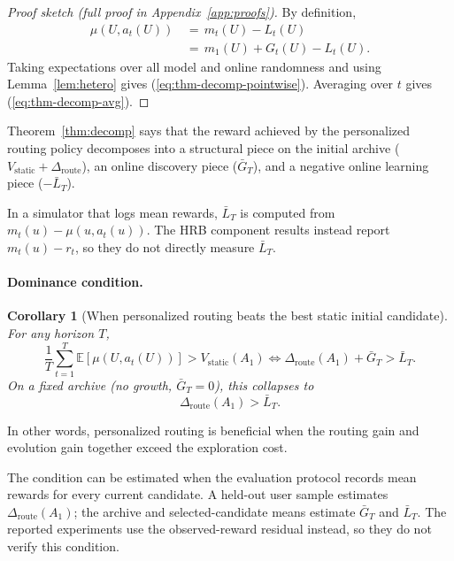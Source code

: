 \documentclass{article} %
\newtheorem{corollary}[theorem]{Corollary}
\providecommand{\E}{\mathbb{E}}
\renewcommand{\eqref}[1]{\textup{(\ref{#1})}}
\begin{document}
\begin{proof}[Proof sketch (full proof in Appendix~\ref{app:proofs})]
By definition,
\begin{equation*}
\begin{aligned}
\mu(U,a_t(U))
&\,=\,m_t(U)-L_t(U)\\
&\,=\,m_1(U)+G_t(U)-L_t(U).
\end{aligned}
\end{equation*}
Taking expectations over all model and online randomness and using
Lemma~\ref{lem:hetero} gives \eqref{eq:thm-decomp-pointwise}. Averaging over
$t$ gives \eqref{eq:thm-decomp-avg}.
\end{proof}

Theorem~\ref{thm:decomp} says that the reward achieved by the personalized routing policy decomposes into a structural piece on the initial archive ($V_{\mathrm{static}}+\Delta_{\mathrm{route}}$), an online discovery piece ($\bar G_T$), and a negative online learning piece ($-\bar L_T$).

In a simulator that logs mean rewards, \(\bar L_T\) is computed from
\(m_t(u)-\mu(u,a_t(u))\). The HRB component results instead report
\(m_t(u)-r_t\), so they do not directly measure \(\bar L_T\).

\paragraph{Dominance condition.}

\label{sec:method-cor-dom}

\begin{corollary}[When personalized routing beats the best static initial candidate]
\label{cor:dominance}
For any horizon $T$,
\begin{equation}
\label{eq:cor-dom}
\frac{1}{T}\sum_{t=1}^T \E[\mu(U, a_t(U))] > V_{\mathrm{static}}(A_1)
\iff
\Delta_{\mathrm{route}}(A_1) + \bar G_T > \bar L_T.
\end{equation}
On a fixed archive (no growth, $\bar G_T = 0$), this collapses to
\begin{equation}
\label{eq:cor-dom-fixed}
\Delta_{\mathrm{route}}(A_1) > \bar L_T.
\end{equation}
\end{corollary}

In other words, personalized routing is beneficial when the routing gain and evolution gain together exceed the exploration cost.

The condition can be estimated when the evaluation protocol records mean
rewards for every current candidate. A held-out user sample estimates
\(\Delta_{\mathrm{route}}(A_1)\); the archive and selected-candidate means
estimate \(\bar G_T\) and \(\bar L_T\). The reported experiments use the
observed-reward residual instead, so they do not verify this condition.
\end{document}
